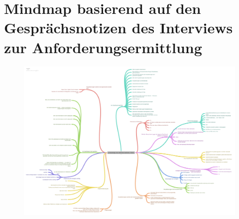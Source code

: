\section{Mindmap basierend auf den Gesprächsnotizen des Interviews zur Anforderungsermittlung} \label{app:interview_mind_map}

\begin{figure}[h]
	\includegraphics[width=16cm]{images/interview_mind_map.png}
\end{figure}
